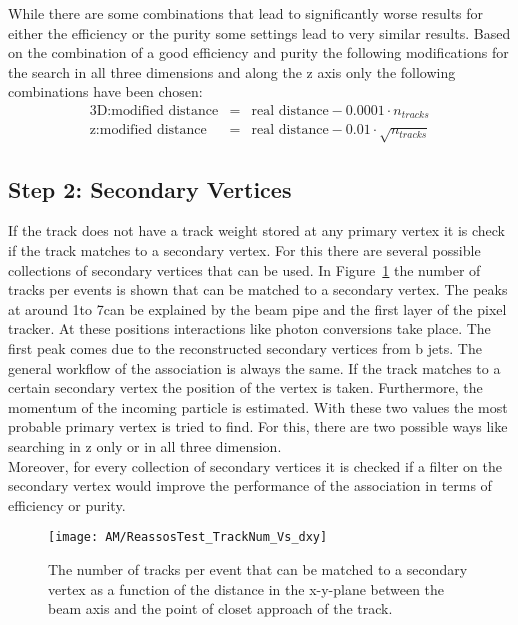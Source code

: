 While there are some combinations that lead to significantly worse results for either the efficiency or the purity some settings lead to very similar results. Based on the combination of a good efficiency and purity the following modifications for the search in all three dimensions and along the z axis only the following combinations have been chosen:
\begin{eqnarray}
\textrm{3D}: \textrm{modified distance} & = & \textrm{real distance} - 0.0001 \cdot n_{tracks} \label{eqn:AMWFCVweight3} \\
\textrm{z}: \textrm{modified distance} & = & \textrm{real distance} - 0.01 \cdot \sqrt{n_{tracks}} \label{eqn:AMWFCVweightz}
\end{eqnarray}

\subsection{Step 2: Secondary Vertices\label{sec:AMWFSV}}

If the track does not have a track weight stored at any primary vertex it is check if the track matches to a secondary vertex. For this there are several possible collections of secondary vertices that can be used. In Figure~\ref{plot:AMWFSVfrac} the number of tracks per events is shown that can be matched to a secondary vertex. The peaks at around 1\cm to 7\cm can be explained by the beam pipe and the first layer of the pixel tracker. At these positions interactions like photon conversions take place. The first peak comes due to the reconstructed secondary vertices from b jets. The general workflow of the association is always the same. If the track matches to a certain secondary vertex the position of the vertex is taken. Furthermore, the momentum of the incoming particle is estimated. With these two values the most probable primary vertex is tried to find. For this, there are two possible ways like searching in z only or in all three dimension.\\
Moreover, for every collection of secondary vertices it is checked if a filter on the secondary vertex would improve the performance of the association in terms of efficiency or purity. 

\begin{figure}[!ht]
  \centering
  \texttt{[image: AM/ReassosTest\_TrackNum\_Vs\_dxy]}
  \caption[Number of tracks that can be matched to a secondary vertex]{The number of tracks per event that can be matched to a secondary vertex as a function of the distance in the x-y-plane between the beam axis and the point of closet approach of the track.\label{plot:AMWFSVfrac}}
\end{figure}

